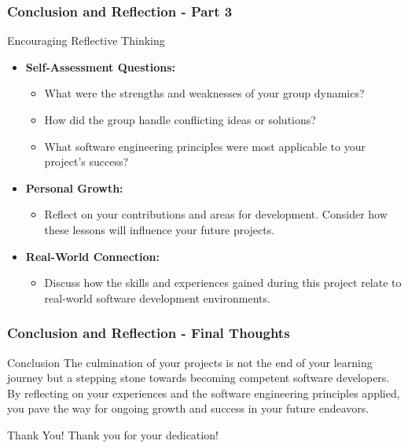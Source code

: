 \documentclass{beamer}
\begin{document}
\begin{frame}[fragile]
    \frametitle{Conclusion and Reflection - Part 3}
    \begin{block}{Encouraging Reflective Thinking}
        \begin{itemize}
            \item \textbf{Self-Assessment Questions:}
            \begin{itemize}
                \item What were the strengths and weaknesses of your group dynamics? 
                \item How did the group handle conflicting ideas or solutions?
                \item What software engineering principles were most applicable to your project’s success?
            \end{itemize}
            \item \textbf{Personal Growth:}
                \begin{itemize}
                    \item Reflect on your contributions and areas for development. Consider how these lessons will influence your future projects.
                \end{itemize}
            \item \textbf{Real-World Connection:}
                \begin{itemize}
                    \item Discuss how the skills and experiences gained during this project relate to real-world software development environments.
                \end{itemize}
        \end{itemize}
    \end{block}
\end{frame}

\begin{frame}[fragile]
    \frametitle{Conclusion and Reflection - Final Thoughts}
    \begin{block}{Conclusion}
        The culmination of your projects is not the end of your learning journey but a stepping stone towards becoming competent software developers. By reflecting on your experiences and the software engineering principles applied, you pave the way for ongoing growth and success in your future endeavors. 
    \end{block}
    \begin{block}{Thank You!}
        Thank you for your dedication!
    \end{block}
\end{frame}
\end{document}
